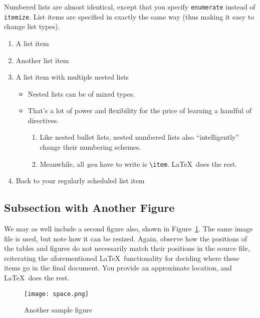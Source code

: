 \documentclass{article}
\begin{document}
Numbered lists are almost identical, except that you specify \verb!enumerate! instead of \verb!itemize!.  List items are specified in exactly the same way (thus making it easy to change list types).

\begin{enumerate}
\item A list item
\item Another list item
\item A list item with multiple nested lists

\begin{itemize}
\item Nested lists can be of mixed types.
\item That's a lot of power and flexibility for the price of learning a handful of directives.

\begin{enumerate}
\item Like nested bullet lists, nested numbered lists also ``intelligently'' change their numbering schemes.
\item Meanwhile, all \emph{you} have to write is \verb!\item!.  \LaTeX\ does the rest.
\end{enumerate}
\end{itemize}

\item Back to your regularly scheduled list item

\end{enumerate}

\subsection{Subsection with Another Figure}

We may as well include a second figure also, shown in Figure~\ref{figure-sample2}.  The same image file is used, but note how it can be resized.  Again, observe how the positions of the tables and figures do not necessarily match their positions in the source file, reiterating the aforementioned \LaTeX\ functionality for deciding where these items go in the final document.  You provide an approximate location, and \LaTeX\ does the rest.

\begin{figure}
\centering
\texttt{[image: space.png]} 

\caption{Another sample figure}
\label{figure-sample2}
\end{figure}
\end{document}

